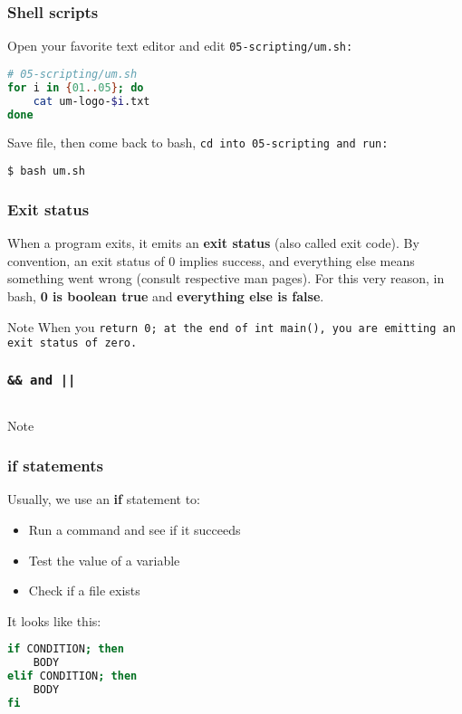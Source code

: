 \begin{frame}[fragile]
\frametitle{Shell scripts}
Open your favorite text editor and edit \tt{05-scripting/um.sh}:
\begin{lstlisting}[language=bash]
# 05-scripting/um.sh
for i in {01..05}; do
    cat um-logo-$i.txt
done
\end{lstlisting}
Save file, then come back to bash, \tt{cd} into \tt{05-scripting} and run:
\begin{lstlisting}[language=bash]
$ bash um.sh
\end{lstlisting}
\end{frame}

\begin{frame}
\frametitle{Exit status}
When a program exits, it emits an \textbf{exit status} (also called exit code).
By convention, an exit status of 0 implies success, and everything else means
something went wrong (consult respective man pages).
\newline \newline
For this very reason, in bash, \textbf{0 is boolean true} and
\textbf{everything else is false}.

\begin{block}{Note}
    When you \tt{return 0;} at the end of \tt{int main()}, you are
    emitting an exit status of zero.
\end{block}
\end{frame}

\begin{frame}[fragile]
\frametitle{\tt{\&\&} and \tt{||}}
\begin{lstlisting}[language=bash]
\end{lstlisting}
\begin{block}{Note}
\end{block}
\end{frame}

\begin{frame}[fragile]
\frametitle{\textbf{if} statements}
Usually, we use an \textbf{if} statement to:
\begin{itemize}
    \item Run a command and see if it succeeds
    \item Test the value of a variable
    \item Check if a file exists
\end{itemize}
It looks like this:
\begin{lstlisting}[language=bash]
if CONDITION; then
    BODY
elif CONDITION; then
    BODY
fi
\end{lstlisting}
\end{frame}

